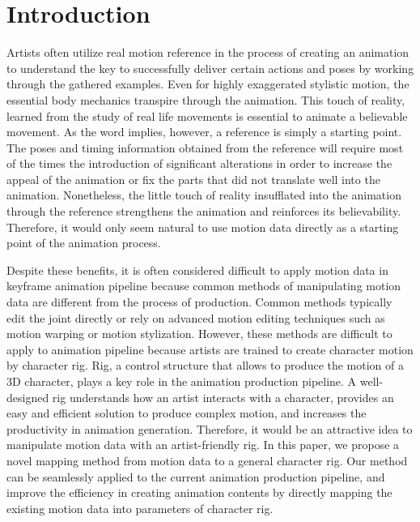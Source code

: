 \section{Introduction}

Artists often utilize real motion reference in the process of creating an animation to understand the key to successfully deliver certain actions and poses by working through the gathered examples. Even for highly exaggerated stylistic motion, the essential body mechanics transpire through the animation. This touch of reality, learned from the study of real life movements is essential to animate a believable movement. As the word implies, however, a reference is simply a starting point. The poses and timing information obtained from the reference will require most of the times the introduction of significant alterations in order to increase the appeal of the animation or fix the parts that did not translate well into the animation. Nonetheless, the little touch of reality insufflated into the animation through the reference strengthens the animation and reinforces its believability. Therefore, it would only seem natural to use motion data directly as a starting point of the animation process.

Despite these benefits, it is often considered difficult to apply motion data in keyframe animation pipeline because common methods of manipulating motion data are different from the process of production. Common methods typically edit the joint directly or rely on advanced motion editing techniques such as motion warping\cite{witkin1995motion} or motion stylization\cite{hsu2005style}. However, these methods are difficult to apply to animation pipeline because artists are trained to create character motion by character rig.
Rig, a control structure that allows to produce the motion of a 3D character, plays a key role in the animation production pipeline. A well-designed rig understands how an artist interacts with a character, provides an easy and efficient solution to produce complex motion,  and increases the productivity in animation generation\cite{mclaughlin2011character,orvalho2012facial}. Therefore, it would be an attractive idea to manipulate motion data with an artist-friendly rig. In this paper, we propose a novel mapping method from motion data to a general character rig. Our method can be seamlessly applied to the current animation production pipeline, and improve the efficiency in creating animation contents by directly mapping the existing motion data into parameters of character rig.

